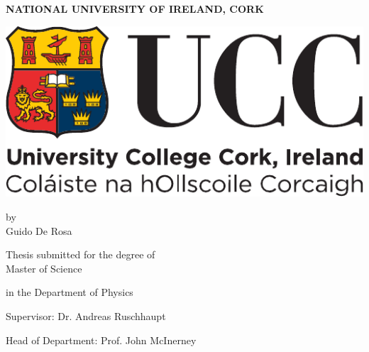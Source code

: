 \thispagestyle{empty}


\begin{centering}

\textbf{NATIONAL UNIVERSITY OF IRELAND, CORK}

\vspace{1cm}

\includegraphics[width=0.333\linewidth]{img/ucc_logo.pdf}

\vspace{0.5in}

\Huge

{\thetitle}

\vspace{0.25in}

\Large
by
\\
Guido De Rosa

\vspace{0.5in}

\large

Thesis submitted for the degree of\\
Master of Science

in the Department of Physics

\vspace{0.25in}

Supervisor: Dr. Andreas Ruschhaupt

Head of Department: Prof. John McInerney

\vspace{2cm}

\Large
\theofficialyear

\end{centering}

\clearpage

\thispagestyle{empty}

\cleardoublepage

\restoregeometry
